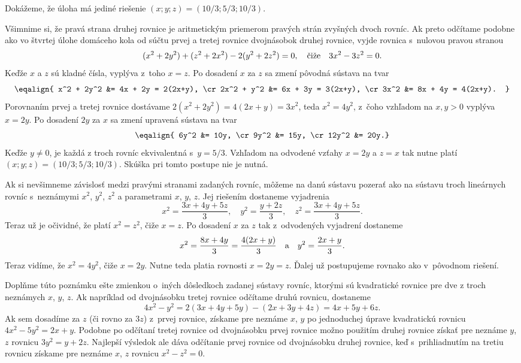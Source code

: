 {%
Dokážeme, že úloha má jediné riešenie $(x;y;z)=(10/3;5/3;10/3)$.

Všimnime si, že pravá strana druhej rovnice je aritmetickým
priemerom pravých strán zvyšných dvoch rovníc.
Ak preto odčítame podobne ako vo štvrtej úlohe domáceho kola od
súčtu prvej a tretej rovnice dvojnásobok druhej rovnice, vyjde
rovnica s~nulovou pravou stranou
$$
(x^2+2y^2) + (z^2+2x^2) - 2(y^2+2z^2)=0,\quad\hbox{čiže}\quad
3x^2-3z^2=0.
$$
Keďže $x$ a $z$ sú kladné čísla, vyplýva z~toho $x=z$.
Po dosadení $x$ za $z$ sa zmení pôvodná sústava na tvar
$$
\eqalign{
x^2 + 2y^2 &= 4x + 2y = 2(2x+y), \cr
2x^2 + y^2 &= 6x + 3y = 3(2x+y), \cr
3x^2 &= 8x + 4y = 4(2x+y).
}
$$
Porovnaním prvej a tretej rovnice dostávame
$2(x^2+2y^2)=4(2x+y)=3x^2$, teda $x^2=4y^2$, z~čoho vzhľadom
na $x,y>0$ vyplýva $x=2y$.
Po dosadení $2y$ za $x$ sa zmení upravená sústava na tvar
$$
\eqalign{
6y^2 &= 10y, \cr
9y^2 &= 15y, \cr
12y^2 &= 20y.}
$$
Keďže $y\ne 0$, je každá z troch rovníc ekvivalentná s~$y=5/3$.
Vzhľadom na odvodené vzťahy $x=2y$ a $z=x$ tak nutne platí
$(x;y;z)=(10/3;5/3;10/3)$. Skúška pri tomto postupe nie je nutná.

\poznamka
Ak si nevšimneme závislosť medzi pravými stranami zadaných rovníc,
môžeme na danú sústavu pozerať ako na sústavu troch
lineárnych rovníc s~neznámymi $x^2$, $y^2$, $z^2$ a parametrami $x$, $y$, $z$.
Jej riešením dostaneme vyjadrenia
$$
x^2=\frac{3x+4y+5z}{3},\quad y^2=\frac{y+2z}{3},\quad
z^2=\frac{3x+4y+5z}{3}.
$$
Teraz už je očividné, že platí $x^2=z^2$, čiže $x=z$.
Po dosadení $x$ za $z$ tak z~odvodených vyjadrení dostaneme
$$
x^2=\frac{8x+4y}{3}=\frac{4(2x+y)}{3}\quad\hbox{a}\quad
y^2=\frac{2x+y}{3}.
$$
Teraz vidíme, že $x^2=4y^2$, čiže $x=2y$. Nutne teda platia
rovnosti $x=2y=z$. Ďalej už postupujeme rovnako ako v~pôvodnom
riešení.

Doplňme túto poznámku ešte zmienkou o~iných dôsledkoch zadanej
sústavy rovníc, ktorými sú kvadratické rovnice pre dve z troch
neznámych $x$, $y$, $z$. Ak napríklad od dvojnásobku
tretej rovnice odčítame druhú rovnicu, dostaneme
$$
4x^2-y^2=2(3x+4y+5y)-(2x+3y+4z)=4x+5y+6z.
$$
Ak sem dosadíme za $z$ (či rovno za $3z$) z~prvej rovnice,
získame pre neznáme $x$, $y$ po jednoduchej úprave kvadratickú rovnicu
$4x^2-5y^2=2x+y$. Podobne po odčítaní tretej rovnice od dvojnásobku
prvej rovnice možno použitím druhej rovnice získať pre neznáme $y$, $z$
rovnicu $3y^2=y+2z$. Najlepší výsledok ale dáva odčítanie prvej
rovnice od dvojnásobku druhej rovnice, keď s~prihliadnutím na tretiu
rovnicu získame pre neznáme $x$, $z$ rovnicu $x^2-z^2=0$.

}
